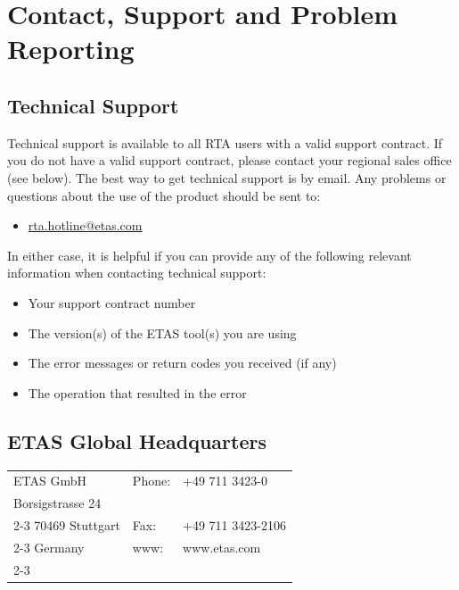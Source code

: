 \chapter{Contact, Support and Problem Reporting}
\section{Technical Support}
Technical support is available to all RTA users with a valid support contract. If you do not have a valid support contract, please contact your regional sales office (see below).
\vfill
The best way to get technical support is by email. Any problems or questions about the use of the product should be sent to: 
\begin{itemize}
	\item \href{rta.hotline@etas.com}{rta.hotline@etas.com}	
\end{itemize}    

In either case, it is helpful if you can provide any of the following relevant information when contacting technical support:
\begin{itemize}
	\item Your support contract number
	\item The version(s) of the ETAS tool(s) you are using
	\item The error messages or return codes you received (if any)
	\item The operation that resulted in the error
\end{itemize}

\vfill

\section{ETAS Global Headquarters}

\begin{tabular}{| p{4.5cm} | p{5cm} | p{5cm} |}
	\hline
	ETAS GmbH & Phone: & +49 711 3423-0 \\
	Borsigstrasse 24 & & \\ \cline{2-3}
	70469 Stuttgart & Fax: & +49 711 3423-2106 \\ \cline{2-3}
	Germany & www: & www.etas.com \\ \cline{2-3}
	\hline 
\end{tabular}

